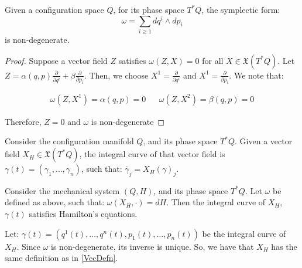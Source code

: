 \begin{lemma}
Given a configuration space $Q$, for its phase space $T^{*} Q$, the symplectic form:
$$\omega = \sum_{i \geq 1} dq^{i} \wedge dp_{i}$$
is non-degenerate. 
\end{lemma}

\begin{proof}
Suppose a vector field $Z$ satisfies $\omega(Z, X) = 0$ for all $X \in \mathfrak{X}(T^{*} Q)$. Let $Z = \alpha(q, p) \frac{\partial}{\partial q^{i}} + \beta \frac{\partial}{\partial p_{i}}$. Then, we choose $X^{1} = \frac{\partial}{\partial q^{i}}$ and $X^{1} = \frac{\partial}{\partial p_{i}}$. We note that: 

\begin{align}
\omega(Z, X^{1}) = \alpha(q,p) = 0 && \omega(Z, X^{2}) = \beta(q,p) = 0  
\end{align}

\noindent Therefore, $Z = 0$ and $\omega$ is non-degenerate
\end{proof}

\begin{defn}
Consider the configuration manifold $Q$, and its phase space $T^{*} Q$. 
Given a vector field $X_{H} \in \mathfrak{X}(T^{*} Q)$, the integral curve of that vector field is $\gamma(t) = (\gamma_{1}, \dots, \gamma_{n})$, such that: $\dot{\gamma_{j}} = X_{H}(\gamma)_{j}$.
\end{defn}

\begin{lemma}
Consider the mechanical system $(Q, H)$, and its phase space $T^{*} Q$. Let  $\omega$ be defined as above, such that: $\omega(X_{H}, \cdot) = dH$. Then the integral curve of $X_{H}$, $\gamma(t)$ satisfies Hamilton's equations. 
\end{lemma}
Let: $\gamma(t) = (q^{1}(t), \dots, q^{n}(t), p_{1}(t), \dots, p_{n}(t))$
be the integral curve of $X_{H}$. Since $\omega$ is non-degenerate, its inverse is unique. So, we have that $X_{H}$ has the same definition as in \ref{VecDefn}.

